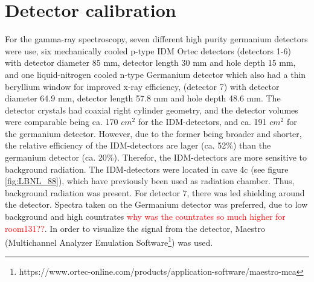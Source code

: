 \section{Detector calibration} \label{sec:detector_calibration}
\noindent  

For the gamma-ray spectroscopy, seven different high purity germanium detectors were use, six mechanically cooled p-type IDM Ortec detectors (detectors 1-6) with detector diameter 85 mm, detector length 30 mm and hole depth 15 mm, and one liquid-nitrogen cooled n-type Germanium detector which also had a thin beryllium window for improved x-ray efficiency, (detector 7) with detector diameter 64.9 mm, detector length 57.8 mm and hole depth 48.6 mm. The detector crystals had coaxial right cylinder geometry, and the detector volumes were comparable being ca. 170 $cm^2$ for the IDM-detectors, and ca. 191 $cm^2$ for the germanium detector. However, due to the former being broader and shorter, the relative efficiency of the IDM-detectors are lager (ca. 52\%) than the germanium detector (ca. 20\%). Therefor, the IDM-detectors are more sensitive to background radiation. The IDM-detectors were located in cave 4c (see figure \ref{fig:LBNL_88}), which have previously been used as radiation chamber. Thus, background radiation was present. For detector 7, there was led shielding around the detector. Spectra taken on the Germanium detector was preferred, due to low background and high countrates \textcolor{red}{why was the countrates so much higher for room131??}. In order to visualize the signal from the detector, Maestro  (Multichannel Analyzer Emulation Software\footnote{https://www.ortec-online.com/products/application-software/maestro-mca}) was used. \\

